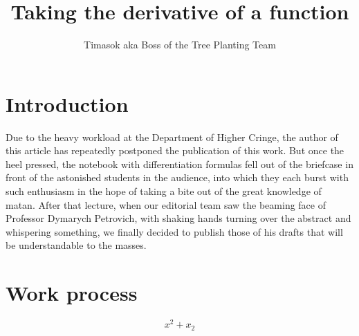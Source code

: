 \documentclass{article}
\title{\textbf{Taking the derivative of a function}}
\author{Timasok aka Boss of the Tree Planting Team}
\begin{document}
\maketitle
\section{Introduction}
Due to the heavy workload at the Department of Higher Cringe, the author of this article has repeatedly postponed the publication of this work. But once the heel pressed, the notebook with differentiation formulas fell out of the briefcase in front of the astonished students in the audience, into which they each burst with such enthusiasm in the hope of taking a bite out of the great knowledge of matan. After that lecture, when our editorial team saw the beaming face of Professor Dymarych Petrovich, with shaking hands turning over the abstract and whispering something, we finally decided to publish those of his drafts that will be understandable to the masses. \section{Work process}

$$
x^{2}+x_2
$$
\end{document}
